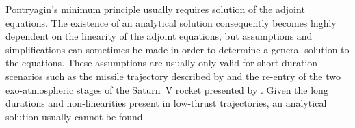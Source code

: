 

Pontryagin's minimum principle usually requires solution of the adjoint equations. %
The existence of an analytical solution consequently becomes highly dependent on the linearity of the adjoint equations, but assumptions and simplifications can sometimes be made in order to determine a general solution to the equations. These assumptions are usually only valid for short duration scenarios such as the missile trajectory described by \textcite{Ohlmeyer2006} and the re-entry of the two exo-atmospheric stages of the Saturn~V rocket presented by \textcite{Haeussermann1965}. Given the long durations and non-linearities present in low-thrust trajectories, an analytical solution usually cannot be found.

